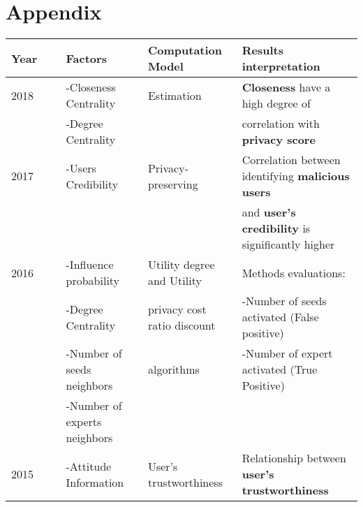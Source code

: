 \onecolumn
\section{Appendix}

\setlength{\hoffset}{-0.5in}

\begin{longtable}{lllll}
	Year  & \                                              & \textbf{Factors}                 & \textbf{Computation Model}       & \textbf{Results interpretation}                               \\\hline
	2018  & \cite{alemany_estimation_2018}                 & -Closeness Centrality            & Estimation                       & \textbf{Closeness} have a high degree of                      \\
	\     &                                                & -Degree Centrality               &                                  & correlation with \textbf{privacy score}                       \\\hline
	2017  & \cite{zhang_privacypreserving_2017}            & -Users Credibility               & Privacy-preserving               & Correlation between identifying \textbf{malicious users}      \\
	\     & \                                              & \                                &                                  & and \textbf{user's credibility} is significantly higher       \\\hline
	2016  & \cite{li_algorithm_2016}                       & -Influence probability           & Utility degree and Utility       & Methods evaluations:                                          \\
	\     & \                                              & -Degree Centrality               & privacy cost ratio discount      & -Number of seeds activated (False positive)                   \\
	\     & \                                              & -Number of seeds neighbors       & algorithms                       & -Number of expert activated (True Positive)                   \\
	\     & \                                              & -Number of experts neighbors     &                                  &                                                               \\\hline
	2015  & \cite{pandey_computing_2015}                   & -Attitude Information            & User’s trustworthiness           & Relationship between \textbf{user’s trustworthiness}          \\

\end{longtable}
